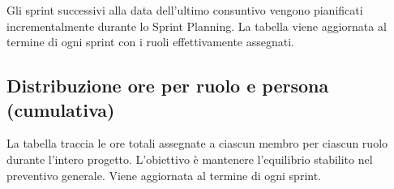 Gli sprint successivi alla data dell'ultimo consuntivo vengono pianificati
incrementalmente durante lo Sprint Planning. La tabella viene aggiornata al
termine di ogni sprint con i ruoli effettivamente assegnati.

\subsection{Distribuzione ore per ruolo e persona (cumulativa)}
La tabella traccia le ore totali assegnate a ciascun membro per ciascun ruolo durante
l'intero progetto. L'obiettivo è mantenere l'equilibrio stabilito nel preventivo
generale. Viene aggiornata al termine di ogni sprint.


